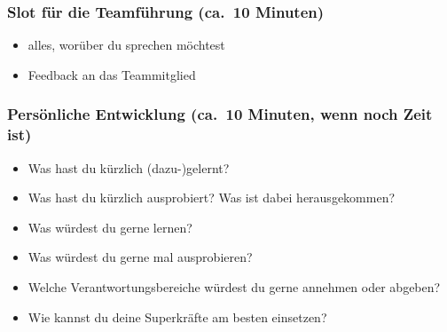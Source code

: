 \subsubsection{Slot für die Teamführung (ca.~10 Minuten)}
\begin{itemize}
 \item alles, worüber du sprechen möchtest
 \item Feedback an das Teammitglied
\end{itemize}


\subsubsection{Persönliche Entwicklung (ca.~10 Minuten, wenn noch Zeit ist)}
\begin{itemize}
 \item Was hast du kürzlich (dazu-)gelernt?
 \item Was hast du kürzlich ausprobiert? Was ist dabei herausgekommen?
 \item Was würdest du gerne lernen?
 \item Was würdest du gerne mal ausprobieren?
 \item Welche Verantwortungsbereiche würdest du gerne annehmen oder abgeben?
 \item Wie kannst du deine Superkräfte am besten einsetzen?
\end{itemize}

